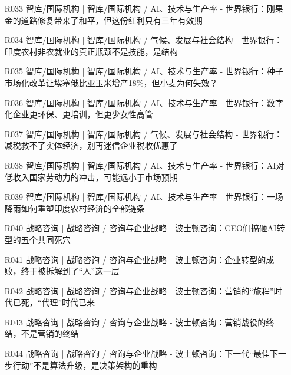 \documentclass[11pt]{ctexart}
\begin{document}
\begin{itemize}
  \item [R033] 智库/国际机构 | 智库/国际机构 / AI、技术与生产率 - 世界银行：刚果金的道路修复带来了和平，但这份红利只有三年有效期
  \item [R034] 智库/国际机构 | 智库/国际机构 / 气候、发展与社会结构 - 世界银行：印度农村非农就业的真正瓶颈不是技能，是结构
  \item [R035] 智库/国际机构 | 智库/国际机构 / AI、技术与生产率 - 世界银行：种子市场化改革让埃塞俄比亚玉米增产18\%，但小麦为何失效？
  \item [R036] 智库/国际机构 | 智库/国际机构 / AI、技术与生产率 - 世界银行：数字化企业更环保、更培训，但更少女性高管
  \item [R037] 智库/国际机构 | 智库/国际机构 / 气候、发展与社会结构 - 世界银行：减税救不了实体经济，别再迷信企业税收优惠了
  \item [R038] 智库/国际机构 | 智库/国际机构 / AI、技术与生产率 - 世界银行：AI对低收入国家劳动力的冲击，可能远小于市场预期
  \item [R039] 智库/国际机构 | 智库/国际机构 / AI、技术与生产率 - 世界银行：一场降雨如何重塑印度农村经济的全部链条
  \item [R040] 战略咨询 | 战略咨询 / 咨询与企业战略 - 波士顿咨询：CEO们搞砸AI转型的五个共同死穴
  \item [R041] 战略咨询 | 战略咨询 / 咨询与企业战略 - 波士顿咨询：企业转型的成败，终于被拆解到了“人”这一层
  \item [R042] 战略咨询 | 战略咨询 / 咨询与企业战略 - 波士顿咨询：营销的“旅程”时代已死，“代理”时代已来
  \item [R043] 战略咨询 | 战略咨询 / 咨询与企业战略 - 波士顿咨询：营销战役的终结，不是营销的终结
  \item [R044] 战略咨询 | 战略咨询 / 咨询与企业战略 - 波士顿咨询：下一代“最佳下一步行动”不是算法升级，是决策架构的重构
\end{itemize}
\end{document}
